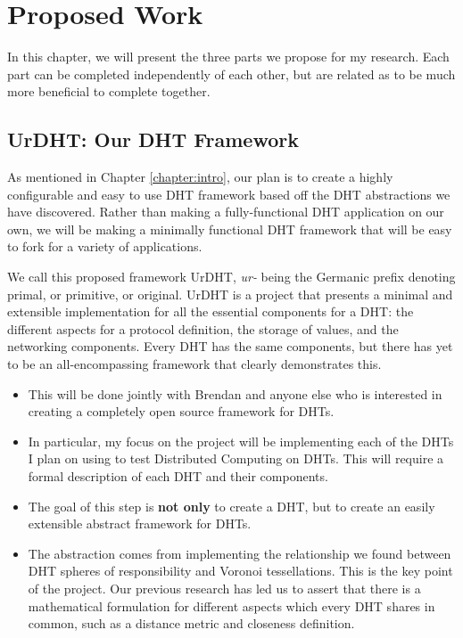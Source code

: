 \chapter{Proposed Work}
\label{chapter:experiments}
In this chapter, we will present the three parts we propose for my research.
Each part can be completed independently of each other, but are related as to be much more beneficial to complete together.

\section{UrDHT: Our DHT Framework}
As mentioned in Chapter \ref{chapter:intro}, our plan is to create a highly configurable and easy to use DHT framework based off the DHT abstractions we have discovered.
Rather than making a fully-functional DHT application on our own, we will be making a minimally functional DHT framework that will be easy to fork for a variety of applications.

We call this proposed framework UrDHT, \textit{ur-} being the Germanic prefix denoting primal, or primitive, or original.
UrDHT is a project that presents a minimal and extensible implementation for all the essential components for a DHT: the different aspects for a protocol definition, the storage of values, and the networking components.
Every DHT has the same components, but there has yet to be an all-encompassing framework that clearly demonstrates this.

\begin{itemize}
	\item This will be done jointly with Brendan and anyone else who is interested in creating a completely open source framework for DHTs.
	\item In particular, my focus on the project will be implementing each of the DHTs I plan on using to test Distributed Computing on DHTs.
	This will require a formal description of each DHT and their components.
	\item The goal of this step is \textbf{not only} to create a DHT, but to create an easily extensible abstract framework for DHTs.
	\item The abstraction comes from implementing the relationship we found between DHT spheres of responsibility and Voronoi tessellations.  
	This is the key point of the project.
	Our previous research \cite{vhash} has led us to assert that there is a mathematical formulation for different aspects which every DHT shares in common, such as a distance metric and closeness definition.
	
\end{itemize}


